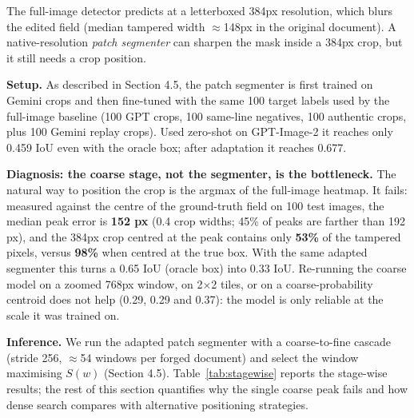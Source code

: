\documentclass[preprint,12pt]{elsarticle}
\begin{document}
The full-image detector predicts at a letterboxed 384px resolution, which blurs the edited field (median tampered width $\approx$148px in the original document). A native-resolution \emph{patch segmenter} can sharpen the mask inside a 384px crop, but it still needs a crop position.

\textbf{Setup.} As described in Section 4.5, the patch segmenter is first trained on Gemini crops and then fine-tuned with the same 100 target labels used by the full-image baseline (100 GPT crops, 100 same-line negatives, 100 authentic crops, plus 100 Gemini replay crops). Used zero-shot on GPT-Image-2 it reaches only 0.459 IoU even with the oracle box; after adaptation it reaches 0.677.

\textbf{Diagnosis: the coarse stage, not the segmenter, is the bottleneck.} The natural way to position the crop is the argmax of the full-image heatmap. It fails: measured against the centre of the ground-truth field on 100 test images, the median peak error is \textbf{152 px} (0.4 crop widths; 45\% of peaks are farther than 192 px), and the 384px crop centred at the peak contains only \textbf{53\%} of the tampered pixels, versus \textbf{98\%} when centred at the true box. With the same adapted segmenter this turns a 0.65 IoU (oracle box) into 0.33 IoU. Re-running the coarse model on a zoomed 768px window, on 2×2 tiles, or on a coarse-probability centroid does not help (0.29, 0.29 and 0.37): the model is only reliable at the scale it was trained on.

\textbf{Inference.} We run the adapted patch segmenter with a coarse-to-fine cascade (stride 256, $\approx$54 windows per forged document) and select the window maximising $S(w)$ (Section 4.5). Table~\ref{tab:stagewise} reports the stage-wise results; the rest of this section quantifies why the single coarse peak fails and how dense search compares with alternative positioning strategies.
\end{document}
